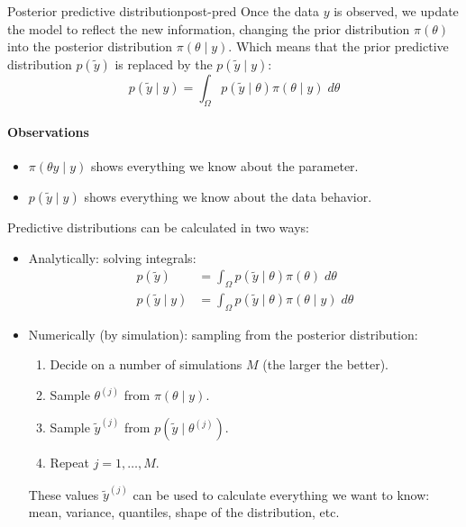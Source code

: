 \begin{definition}{Posterior predictive distribution}{post-pred}
	Once the data $y$ is observed, we update the model to reflect the new information,
	changing the prior distribution $\pi(\theta)$ into the posterior distribution $\pi(\theta \mid y)$.
	Which means that the prior predictive distribution $p(\tilde y)$ is replaced by the
	 $p(\tilde y \mid y)$:
	\begin{equation}
		p(\tilde y \mid y) = \int_{\Omega} p(\tilde y \mid \theta) \pi(\theta \mid y) \;d\theta
	\end{equation}

	\paragraph{Observations}
	\begin{itemize}
		\item $\pi(\theta y \mid y)$ shows everything we know about the parameter.
		\item $p(\tilde y \mid y)$ shows everything we know about the data behavior.
	\end{itemize}
\end{definition}

Predictive distributions can be calculated in two ways:
\begin{itemize}
	\item Analytically: solving integrals:
	      \begin{align*}
		      p(\tilde y)        & = \int_{\Omega} p(\tilde y \mid \theta) \pi(\theta) \;d\theta        \\
		      p(\tilde y \mid y) & = \int_{\Omega} p(\tilde y \mid \theta) \pi(\theta \mid y) \;d\theta
	      \end{align*}
	\item Numerically (by simulation): sampling from the posterior distribution:
	      \begin{enumerate}
		      \item Decide on a number of simulations $M$ (the larger the better).
		      \item Sample $\theta^{(j)}$ from $\pi(\theta \mid y)$.
		      \item Sample $\tilde y^{(j)}$ from $p(\tilde y \mid \theta^{(j)})$.
		      \item Repeat $j=1,\ldots,M$.
	      \end{enumerate}
	      These values $\tilde y^{(j)}$ can be used to calculate everything we want to know:
	      mean, variance, quantiles, shape of the distribution, etc.
\end{itemize}

